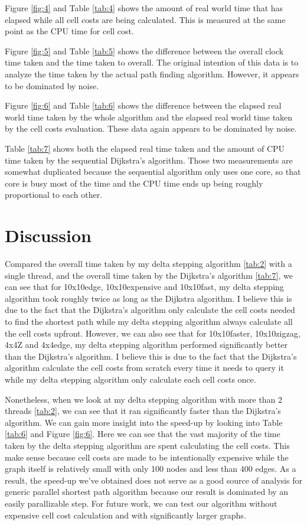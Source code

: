 \documentclass{article}
\begin{document}
Figure \ref{fig:4} and Table \ref{tab:4} shows the amount of real world time that has elapsed while
all cell costs are being calculated. This is measured at the same point as the CPU time for cell
cost.

Figure \ref{fig:5} and Table \ref{tab:5} shows the difference between the overall clock time taken
and the time taken to overall. The original intention of this data is to analyze the time taken by
the actual path finding algorithm. However, it appears to be dominated by noise.

Figure \ref{fig:6} and Table \ref{tab:6} shows the difference between the elapsed real world time
taken by the whole algorithm and the elapsed real world time taken by the cell costs evaluation.
These data again appears to be dominated by noise.

Table \ref{tab:7} shows both the elapsed real time taken and the amount of CPU time taken by the
sequential Dijkstra's algorithm. Those two measurements are somewhat duplicated because the
sequential algorithm only uses one core, so that core is busy most of the time and the CPU time ends
up being roughly proportional to each other.

\section*{Discussion}
Compared the overall time taken by my delta stepping algorithm \ref{tab:2} with a single thread, and
the overall time taken by the Dijkstra's algorithm \ref{tab:7}, we can see that for 10x10edge,
10x10expensive and 10x10fast, my delta stepping algorithm took roughly twice as long as the Dijkstra
algorithm. I believe this is due to the fact that the Dijkstra's algorithm only calculate the cell
costs needed to find the shortest path while my delta stepping algorithm always calculate all the
cell costs upfront. However, we can also see that for 10x10faster, 10x10zigzag, 4x4Z and 4x4edge, my
delta stepping algorithm performed significantly better than the Dijkstra's algorithm. I believe
this is due to the fact that the Dijkstra's algorithm calculate the cell costs from scratch
every time it needs to query it while my delta stepping algorithm only calculate each cell costs
once.

Nonetheless, when we look at my delta stepping algorithm with more than 2 threads \ref{tab:2}, we
can see that it ran significantly faster than the Dijkstra's algorithm. We can gain more insight
into the speed-up by looking into Table \ref{tab:6} and Figure \ref{fig:6}. Here we can see that the
vast majority of the time taken by the delta stepping algorithm are spent calculating the cell
costs. This make sense because cell costs are made to be intentionally expensive while the graph
itself is relatively small with only 100 nodes and less than 400 edges. As a result, the speed-up
we've obtained does not serve as a good source of analysis for generic parallel shortest path
algorithm because our result is dominated by an easily parallizable step. For future work, we can
test our algorithm without expensive cell cost calculation and with significantly larger graphs.
\end{document}
